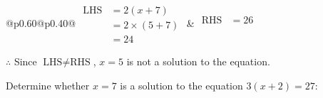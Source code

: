 \documentclass[12pt]{article}
\newcounter{minipagecount}
\begin{document}
\begin{multicols}{2}
\begin{minipage}[t]{0.40\textwidth}
    \renewcommand{\arraystretch}{1.3} %
    \begin{tabular}{@{}p{0.60\linewidth}@{}p{0.40\linewidth}@{}}
        \(\begin{aligned}
            \text{LHS} &= 2(x + 7) \\
                    &= 2 \times(5 + 7) \\
                    &= 24
        \end{aligned}\) &
        \(\begin{aligned}
            \text{RHS} &= 26\\
                    & \\
                    &
        \end{aligned}\)
    \end{tabular}
    \renewcommand{\arraystretch}{1.0} %
    \vspace{2pt}  %

    \noindent \(\therefore\) Since \(\text{LHS} \neq \text{RHS}\), \(x = 5\) is not  a solution to the equation.

\end{minipage}

 \vspace*{16pt}
\noindent{(\theminipagecount)}\hspace{0.1mm} %
\begin{minipage}[t]{0.40\textwidth} %

    \noindent Determine whether \(x = 7\) is a solution to the equation \(3(x + 2) = 27\):
    \vspace{4pt}  %

    \noindent


\end{minipage}
\end{multicols}
\end{document}
